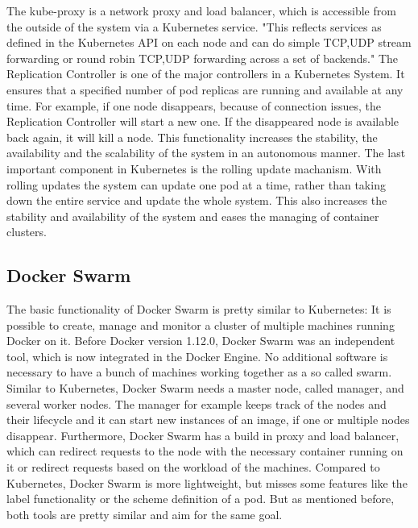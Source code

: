The kube-proxy is a network proxy and load balancer, which is accessible from the outside of the system via a Kubernetes service.\autocite[cf.][p. 7]{Mulyana:2016}
"This reflects services as defined in the Kubernetes API on each node and can do simple TCP,UDP stream forwarding or round robin TCP,UDP forwarding across a set of backends."\autocite{Kubernetes:kube-proxy:2016}
The Replication Controller is one of the major controllers in a Kubernetes System.
It ensures that a specified number of pod replicas are running and available at any time.\autocite[cf.]{Kubernetes:replication-controller:2016}
For example, if one node disappears, because of connection issues, the Replication Controller will start a new one.
If the disappeared node is available back again, it will kill a node.
This functionality increases the stability, the availability and the scalability of the system in an autonomous manner.
The last important component in Kubernetes is the rolling update machanism.
With rolling updates the system can update one pod at a time, rather than taking down the entire service and update the whole system.\autocite[cf.]{Kubernetes:rolling-updates:2016}
This also increases the stability and availability of the system and eases the managing of container clusters.

\subsection{Docker Swarm}
The basic functionality of Docker Swarm is pretty similar to Kubernetes: It is possible to create, manage and monitor a cluster of multiple machines running Docker on it.
Before Docker version 1.12.0, Docker Swarm was an independent tool, which is now integrated in the Docker Engine.\autocite[cf.]{dockerSwarm}
No additional software is necessary to have a bunch of machines working together as a so called swarm.
Similar to Kubernetes, Docker Swarm needs a master node, called manager, and several worker nodes.
The manager for example keeps track of the nodes and their lifecycle and it can start new instances of an image, if one or multiple nodes disappear.
Furthermore, Docker Swarm has a build in proxy and load balancer, which can redirect requests to the node with the necessary container running on it or redirect requests based on the workload of the machines.
Compared to Kubernetes, Docker Swarm is more lightweight, but misses some features like the label functionality or the scheme definition of a pod.
But as mentioned before, both tools are pretty similar and aim for the same goal.


